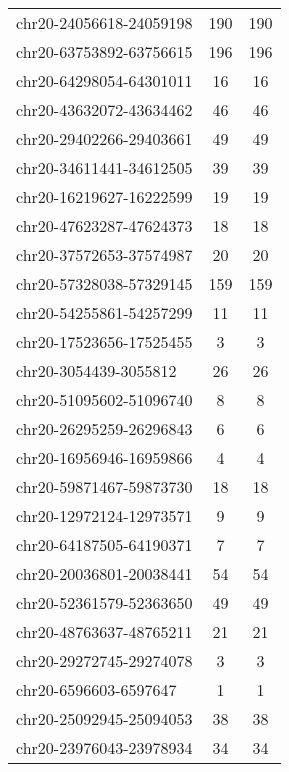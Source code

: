 \documentclass[10pt,letterpaper]{article}
\begin{document}
{\begin{longtable}{lSS}
	chr20-24056618-24059198 & 190    & 190                   \\
	chr20-63753892-63756615 & 196    & 196                   \\
	chr20-64298054-64301011 & 16     & 16                    \\
	chr20-43632072-43634462 & 46     & 46                    \\
	chr20-29402266-29403661 & 49     & 49                    \\
	chr20-34611441-34612505 & 39     & 39                    \\
	chr20-16219627-16222599 & 19     & 19                    \\
	chr20-47623287-47624373 & 18     & 18                    \\
	chr20-37572653-37574987 & 20     & 20                    \\
	chr20-57328038-57329145 & 159    & 159                   \\
	chr20-54255861-54257299 & 11     & 11                    \\
	chr20-17523656-17525455 & 3      & 3                     \\
	chr20-3054439-3055812   & 26     & 26                    \\
	chr20-51095602-51096740 & 8      & 8                     \\
	chr20-26295259-26296843 & 6      & 6                     \\
	chr20-16956946-16959866 & 4      & 4                     \\
	chr20-59871467-59873730 & 18     & 18                    \\
	chr20-12972124-12973571 & 9      & 9                     \\
	chr20-64187505-64190371 & 7      & 7                     \\
	chr20-20036801-20038441 & 54     & 54                    \\
	chr20-52361579-52363650 & 49     & 49                    \\
	chr20-48763637-48765211 & 21     & 21                    \\
	chr20-29272745-29274078 & 3      & 3                     \\
	chr20-6596603-6597647   & 1      & 1                     \\
	chr20-25092945-25094053 & 38     & 38                    \\
	chr20-23976043-23978934 & 34     & 34                    \\

\end{longtable}}
\end{document}
